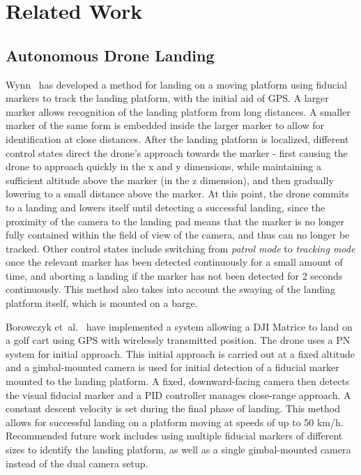 \section{Related Work}

\subsection{Autonomous Drone Landing}

Wynn~\cite{wynn} has developed a method for landing on a moving platform using fiducial markers to track the landing platform, with the initial aid of GPS. A larger marker allows recognition of the landing platform from long distances. A smaller marker of the same form is embedded inside the larger marker to allow for identification at close distances. After the landing platform is localized, different control states direct the drone's approach towards the marker - first causing the drone to approach quickly in the x and y dimensions, while maintaining a sufficient altitude above the marker (in the z dimension), and then gradually lowering to a small distance above the marker. At this point, the drone commits to a landing and lowers itself until detecting a successful landing, since the proximity of the camera to the landing pad means that the marker is no longer fully contained within the field of view of the camera, and thus can no longer be tracked. Other control states include switching from \textit{patrol mode} to \textit{tracking mode} once the relevant marker has been detected continuously for a small amount of time, and aborting a landing if the marker has not been detected for 2 seconds continuously. This method also takes into account the swaying of the landing platform itself, which is mounted on a barge.

Borowczyk et~al.~\cite{high_velocity_landing} have implemented a system allowing a DJI Matrice to land on a golf cart using  {GPS} with wirelessly transmitted position. The drone uses a {PN} system for initial approach. This initial approach is carried out at a fixed altitude and a gimbal-mounted camera is used for initial detection of a fiducial marker mounted to the landing platform. A fixed, downward-facing camera then detects the visual fiducial marker and a  {PID} controller manages close-range approach. A constant descent velocity is set during the final phase of landing. This method allows for successful landing on a platform moving at speeds of up to 50 km/h. Recommended future work includes using multiple fiducial markers of different sizes to identify the landing platform, as well as a single gimbal-mounted camera instead of the dual camera setup.


